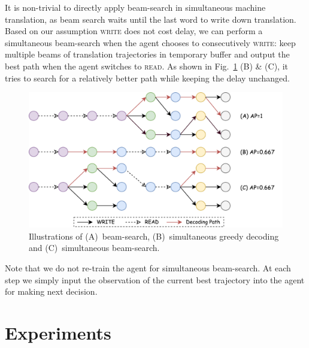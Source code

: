 It is non-trivial to directly apply beam-search in simultaneous machine translation,
as beam search waits until the last word to write down translation. Based on our assumption \textsc{write} does not cost delay,
we can perform a simultaneous beam-search when the agent chooses to consecutively \textsc{write}: keep multiple beams of translation trajectories in temporary buffer and output the best path when the agent switches to \textsc{read}. As shown in Fig.~\ref{cp9.fig.beam} (B) \& (C), it tries to search for a relatively better path while keeping the delay unchanged.

\begin{figure}[t]
   	\centering
          	
          	\includegraphics[width=\linewidth]{figs/simultrans/decoding.pdf} 
          	\caption{\label{cp9.fig.beam} {Illustrations of (A)~beam-search, (B)~simultaneous greedy decoding and (C)~simultaneous beam-search.}} 
  
\end{figure} 

Note that we do not re-train the agent for simultaneous beam-search. At each step we simply input the observation of the current best trajectory into the agent for making next decision. %



\section{Experiments}
\label{cp9.sec.experiments}

